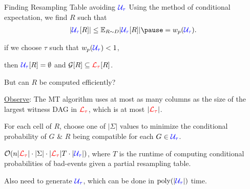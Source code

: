 \documentclass{beamer}
\def\padding{\vspace{0.5cm}}
\def\spadding{\vspace{0.25cm}}
\begin{document}
\begin{frame}{Finding Resampling Table avoiding $\textcolor{blue}{\mathcal{U}_\tau}$}
Using the method of conditional expectation, we find $R$ such that \vspace{-0.5em}\begin{align*}
    |\compat{\U}{R}| \leq \E[R \sim D]{|\compat{\U}{R}|} \pause = \w(\U).
\end{align*}\pause

\vspace{-1.8em}\follows if we choose $\tau$ such that $w_p(\textcolor{blue}{\mathcal{U}_\tau}) < 1$,\par then $\textcolor{blue}{\mathcal{U}_\tau}[R] = \emptyset$ and $\mathcal{G}[R] \subseteq \textcolor{red}{\mathcal{L}_\tau}[R]$.\pause\padding

But can $R$ be computed efficiently?\pause\spadding

\underline{Observe}: The MT algorithm uses at most as many columns as the size of the largest witness DAG in $\textcolor{red}{\mathcal{L}_\tau}$\pause, which is at most $|\textcolor{red}{\mathcal{L}_\tau}|$.\pause\spadding

For each cell of $R$, choose one of $|\Sigma|$ values to minimize the conditional probability of $G$ \& $R$ being compatible for each $G \in \textcolor{blue}{\mathcal{U}_\tau}$.\pause\spadding

\follows $\mathcal{O}(n |\textcolor{red}{\mathcal{L}_\tau}| \cdot |\Sigma| \cdot |\textcolor{red}{\mathcal{L}_\tau}| T \cdot |\textcolor{blue}{\mathcal{U}_\tau}|)$\pause, where $T$ is the runtime of computing conditional probabilities of bad-events given a partial resampling table.\pause\par
Also need to generate $\textcolor{blue}{\mathcal{U}_\tau}$, which can be done in $\mathrm{poly}(|\textcolor{blue}{\mathcal{U}_\tau}|)$ time.
\end{frame}
\end{document}
